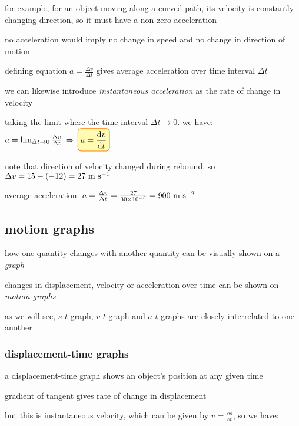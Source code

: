 for example, for an object moving along a curved path, its velocity is constantly changing direction, so it must have a non-zero acceleration

no acceleration would imply no change in speed and no change in direction of motion

\cmt defining equation $a = \frac{\Delta v}{\Delta t}$ gives average acceleration over time interval $\Delta t$

we can likewise introduce \emph{instantaneous acceleration} as the rate of change in velocity

taking the limit where the time interval $\Delta t \to 0$. we have: $a = \lim_{\Delta t \to 0} \frac{\Delta v}{\Delta t} \ra \boxed{a=\frac{\dd v}{\dd t}} $


\sol note that direction of velocity changed during rebound, so $\Delta v = 15 - (-12) = 27 \text{ m s$^{-1}$}$

average acceleration: $a = \frac{\Delta v}{\Delta t} = \frac{27}{30 \times 10^{-3}} = 900 \text{ m s$^{-2}$}$ \eoe



\subsection{motion graphs}

how one quantity changes with another quantity can be visually shown on a \emph{graph}

changes in displacement, velocity or acceleration over time can be shown on \emph{motion graphs}

as we will see, $s$-$t$ graph, $v$-$t$ graph and $a$-$t$ graphs are closely interrelated to one another

\subsubsection{displacement-time graphs}

a displacement-time graph shows an object's position at any given time

\cmt gradient of tangent gives rate of change in displacement

but this is instantaneous velocity, which can be given by $v = \frac{\dd s}{\dd t}$, so we have:

